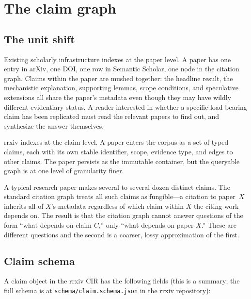 \documentclass[11pt]{rrxiv}
\begin{document}
\section{The claim graph}
\label{sec:claim-graph}

\subsection{The unit shift}

Existing scholarly infrastructure indexes at the paper level. A paper has one entry in arXiv, one DOI, one row in Semantic Scholar, one node in the citation graph. Claims within the paper are mushed together: the headline result, the mechanistic explanation, supporting lemmas, scope conditions, and speculative extensions all share the paper's metadata even though they may have wildly different evidentiary status. A reader interested in whether a specific load-bearing claim has been replicated must read the relevant papers to find out, and synthesize the answer themselves.

rrxiv indexes at the claim level. A paper enters the corpus as a set of typed claims, each with its own stable identifier, scope, evidence type, and edges to other claims. The paper persists as the immutable container, but the queryable graph is at one level of granularity finer.

\begin{observation}
A typical research paper makes several to several dozen distinct claims. The standard citation graph treats all such claims as fungible---a citation to paper~$X$ inherits all of $X$'s metadata regardless of which claim within $X$ the citing work depends on. The result is that the citation graph cannot answer questions of the form ``what depends on claim $C$,'' only ``what depends on paper $X$.'' These are different questions and the second is a coarser, lossy approximation of the first.
\end{observation}

\subsection{Claim schema}

A claim object in the rrxiv CIR has the following fields (this is a summary; the full schema is at \texttt{schema/claim.schema.json} in the rrxiv repository):
\end{document}
